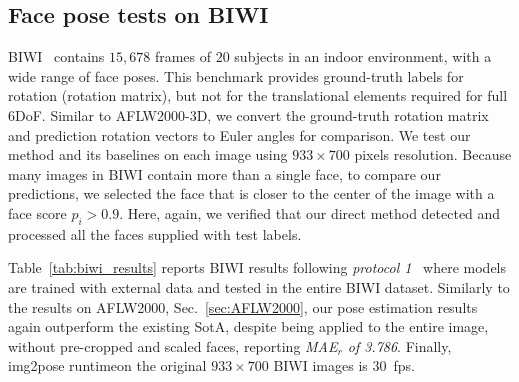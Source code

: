 \documentclass[final]{cvpr}
\newcommand{\minisection}[1]{\vspace{1mm}\noindent{\textbf{#1}.}}
\begin{document}
\subsection{Face pose tests on BIWI}\label{sec:BIWI}
BIWI~\cite{biwi} contains $15,678$ frames of $20$ subjects in an indoor environment, with a wide range of face poses. 
This benchmark provides ground-truth labels for rotation (rotation matrix), but not for the translational elements required for full 6DoF.
Similar to AFLW2000-3D, we convert the ground-truth rotation matrix and prediction rotation vectors to Euler angles for comparison.
We test our method and its baselines on each image using $933\times700$ pixels resolution. Because many images in BIWI contain more than a single face, to compare our predictions, we selected the face that is closer to the center of the image with a face score $p_i > 0.9$. Here, again, we verified that our direct method detected and processed all the faces supplied with test labels. 

\minisection{BIWI face pose results} Table~\ref{tab:biwi_results} reports BIWI results following {\em protocol 1}~\cite{hopenet, fsanet} where models are trained with external data and tested in the entire BIWI dataset. Similarly to the results on AFLW2000, Sec.~\ref{sec:AFLW2000}, our pose estimation results again outperform the existing SotA, despite being applied to the entire image, without pre-cropped and scaled faces, reporting {\em MAE$_r$ of 3.786}. Finally, img2pose runtimeon the original $933\times700$ BIWI images is 30~fps.
\end{document}
